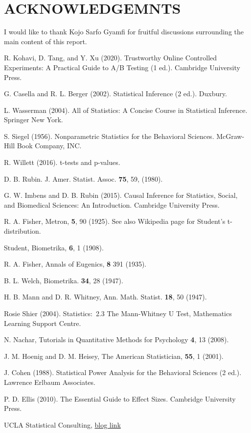 \documentclass[10pt, aps,twocolumn, superscriptaddress, nofootinbib]{revtex4-2}
\begin{document}
   \section*{ACKNOWLEDGEMNTS}
 I would like to thank Kojo Sarfo Gyamfi for fruitful discussions surrounding the main content of this report.


\begin{thebibliography}{99}

R. Kohavi, D. Tang, and Y. Xu (2020). Trustworthy Online Controlled Experiments: A Practical Guide to A/B Testing (1 ed.). Cambridge University Press.

G.  Casella and R. L. Berger (2002). Statistical Inference (2 ed.). Duxbury.

L.  Wasserman (2004). All of Statistics: A Concise Course in Statistical Inference. Springer New York.

S. Siegel (1956). Nonparametric Statistics for the Behavioral Sciences. McGraw-Hill Book Company, INC.


R. Willett (2016). t-tests and p-values.

D. B. Rubin. J. Amer. Statist. Assoc.  {\bf 75}, 59, (1980).

 G. W. Imbens and  D. B. Rubin (2015). Causal Inference for Statistics, Social, and Biomedical Sciences: An Introduction. Cambridge University Press.

R. A. Fisher, Metron,  {\bf 5}, 90 (1925). See also Wikipedia page for Student's t-distribution.

 Student,  Biometrika, {\bf 6}, 1 (1908).

R. A. Fisher,   Annals of Eugenics, {\bf 8}  391 (1935).

B. L. Welch, Biometrika.  {\bf 34}, 28 (1947). 

H. B. Mann and D. R. Whitney, Ann. Math. Statist. {\bf  18}, 50 (1947).

Rosie Shier (2004). Statistics:~2.3 The Mann-Whitney U Test, Mathematics Learning Support Centre.

N. Nachar, Tutorials in Quantitative Methods for Psychology {\bf 4}, 13 (2008).

J. M. Hoenig and D. M. Heisey, The American Statistician, {\bf 55},  1 (2001).

J. Cohen (1988). Statistical Power Analysis for the Behavioral Sciences (2 ed.). Lawrence Erlbaum Associates.

P. D. Ellis (2010). The Essential Guide to Effect Sizes. Cambridge University Press.

UCLA Statistical Consulting,  \href{https://stats.idre.ucla.edu/other/mult-pkg/seminars/intro-power/}{blog link}

\end{thebibliography}
\end{document}
